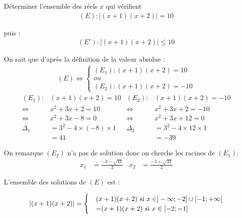\begin{exercice}
    \par Déterminer l'ensemble des réels $x$ qui vérifient 
\begin{align*}
    (E) : |(x+1)(x+2)| = 10
\end{align*}
\par puis :
\begin{align*}
    (E') : |(x+1)(x+2)| \leq 10
\end{align*}
\par On sait que d'après la définition de la valeur absolue :
\begin{align*}
    (E) \iff
    \begin{cases}
        (E_1) : (x+1)(x+2) = 10 \\
        ou \\
        (E_2) : (x+1)(x+2) = -10
    \end{cases}
\end{align*}
\begin{align*}
    (E_1) : & (x+1)(x+2) = 10  & (E_2) : & (x+1)(x+2) = -10 \\
    \iff &x^2 + 3x + 2 = 10   & \iff &x^2 + 3x + 2 = -10 \\ 
    \iff &x^2 + 3x -8 = 0     & \iff &x^2 + 3x + 12 = 0 \\
    \Delta_1 &= 3^2 - 4 \times (-8) \times 1 & \Delta_2 &= 3^2 - 4 \times 12 \times 1 \\
    &= 41 & &= -39
\end{align*}
\par On remarque $(E_2)$ n'a pas de solution donc on cherche les racines de $(E_1)$.
\begin{align*}
    x_1 &= \frac{-3 - \sqrt{41}}{2} & x_2 &= \frac{-3 + \sqrt{41}}{2}
\end{align*}
\par L'ensemble des solutions de $(E)$ est : 

\begin{align*}
    |(x+1)(x+2)| = 
    \begin{cases}
        &(x+1)(x+2) \textnormal{ si } x \in ]-\infty;-2] \cup [-1;+\infty[ \\
        &-(x+1)(x+2) \textnormal{ si } x \in [-2;-1]
    \end{cases}
\end{align*}


\end{exercice}
